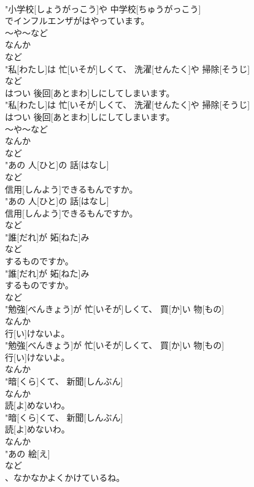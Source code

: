 \documentclass[8pt]{extreport}
\begin{document}
\begin{CJK}{UTF8}{min}
\\	"小学校[しょうがっこう]や 中学校[ちゅうがっこう]
\\	でインフルエンザがはやっています。
\\	～や～など 
\\	なんか	
\\	など
\\	"私[わたし]は 忙[いそが]しくて、 洗濯[せんたく]や 掃除[そうじ]
\\	など
\\	はつい 後回[あとまわ]しにしてしまいます。
\\	"私[わたし]は 忙[いそが]しくて、 洗濯[せんたく]や 掃除[そうじ]
\\	はつい 後回[あとまわ]しにしてしまいます。
\\	～や～など 
\\	なんか	
\\	など
\\	"あの 人[ひと]の 話[はなし]
\\	など
\\	信用[しんよう]できるもんですか。
\\	"あの 人[ひと]の 話[はなし]
\\	信用[しんよう]できるもんですか。
\\	など
\\	"誰[だれ]が 妬[ねた]み
\\	など
\\	するものですか。
\\	"誰[だれ]が 妬[ねた]み
\\	するものですか。
\\	など
\\	"勉強[べんきょう]が 忙[いそが]しくて、 買[か]い 物[もの]
\\	なんか
\\	行[い]けないよ。
\\	"勉強[べんきょう]が 忙[いそが]しくて、 買[か]い 物[もの]
\\	行[い]けないよ。
\\	なんか
\\	"暗[くら]くて、 新聞[しんぶん]
\\	なんか
\\	読[よ]めないわ。
\\	"暗[くら]くて、 新聞[しんぶん]
\\	読[よ]めないわ。
\\	なんか
\\	"あの 絵[え]
\\	など
\\	、なかなかよくかけているね。

\end{CJK}
\end{document}
